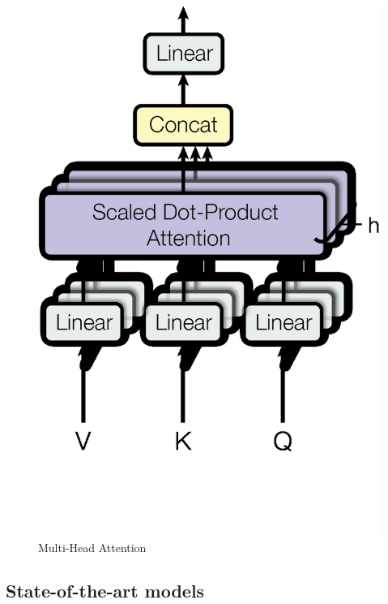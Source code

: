 \begin{minipage}[ht]{.35\textwidth}
\begin{figure}[H]
        \includegraphics[width=.9\textwidth]{literature/imgs/ext-attention-multihead.png}
        \vspace*{-.4cm}
        \caption{Multi-Head Attention \cite{vaswani2017attention}}
        \label{fig:ext-attention-multihead}
    \end{figure}
\end{minipage}

\citet{vaswani2017attention}

\citet{devlin2019bert}


\subsection{State-of-the-art models}

\citet{srinivas2021bottleneck}

\citet{wang2021pyramid}

\citet{dai2021coatnet}
